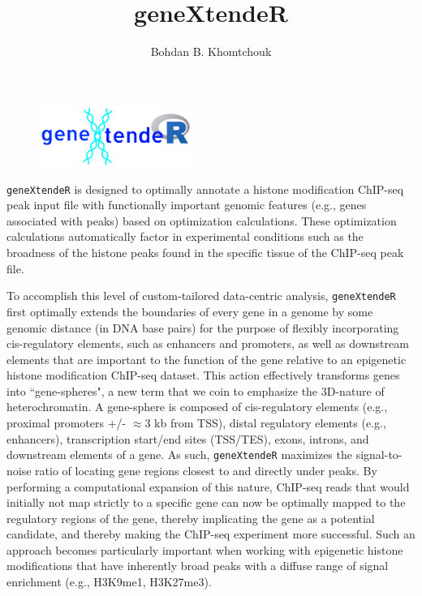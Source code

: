 \documentclass[12pt]{article}
\title{geneXtendeR}
\author{Bohdan B. Khomtchouk}
\begin{document}


\maketitle

\begin{figure}[H]
\centering
\includegraphics[width=50mm,scale=0.5]{figures/geneXtendeRlogo.png}
\end{figure}

\texttt{geneXtendeR} is designed to optimally annotate a histone modification ChIP-seq peak input file with functionally important genomic features (e.g., genes associated with peaks) based on optimization calculations.  These optimization calculations automatically factor in experimental conditions such as the broadness of the histone peaks found in the specific tissue of the ChIP-seq peak file.  

To accomplish this level of custom-tailored data-centric analysis, \texttt{geneXtendeR} first optimally extends the boundaries of every gene in a genome by some genomic distance (in DNA base pairs) for the purpose of flexibly incorporating cis-regulatory elements, such as enhancers and promoters, as well as downstream elements that are important to the function of the gene relative to an epigenetic histone modification ChIP-seq dataset.  This action effectively transforms genes into ``gene-spheres", a new term that we coin to emphasize the 3D-nature of heterochromatin.  A gene-sphere is composed of cis-regulatory elements (e.g., proximal promoters +/- $\approx 3$ kb from TSS), distal regulatory elements (e.g., enhancers), transcription start/end sites (TSS/TES), exons, introns, and downstream elements of a gene.  As such, \texttt{geneXtendeR} maximizes the signal-to-noise ratio of locating gene regions closest to and directly under peaks. By performing a computational expansion of this nature, ChIP-seq reads that would initially not map strictly to a specific gene can now be optimally mapped to the regulatory regions of the gene, thereby implicating the gene as a potential candidate, and thereby making the ChIP-seq experiment more successful. Such an approach becomes particularly important when working with epigenetic histone modifications that have inherently broad peaks with a diffuse range of signal enrichment (e.g., H3K9me1, H3K27me3). 
\end{document}
